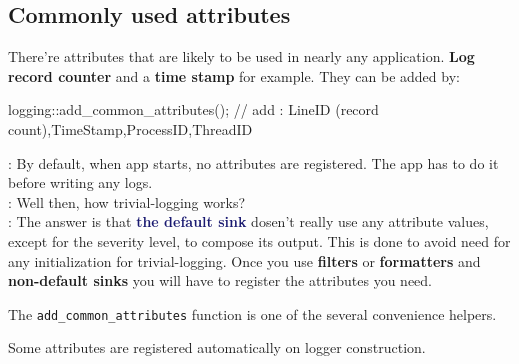 \documentclass[dvipsnames]{article}
\newcommand{\mycola}{MidnightBlue}
\newcommand{\Cola}[1]{\textcolor{\mycola}{\textbf{#1}}}
\begin{document}
\subsection{Commonly used attributes}

There're attributes that are likely to be used in nearly any application. \textbf{Log
  record counter} and a \textbf{time stamp} for example. They can be added by:
\begin{simplec}
  logging::add_common_attributes();
  // add : LineID (record count),TimeStamp,ProcessID,ThreadID
\end{simplec}

\begin{tcolorbox}
   : By default, when app starts, no attributes are registered.
  The app has to do it before writing any logs.\\
   : Well then, how trivial-logging works?\\
   : The answer is that \Cola{the default sink} dosen't really use
  any attribute values, except for the severity level, to compose its output.
  This is done to avoid need for any initialization for trivial-logging. Once
  you use \textbf{filters} or \textbf{formatters} and \textbf{non-default sinks}
  you will have to register the attributes you need.
\end{tcolorbox}

The \verb|add_common_attributes| function is one of the several convenience
helpers.

Some attributes are registered automatically on logger construction.
\end{document}
